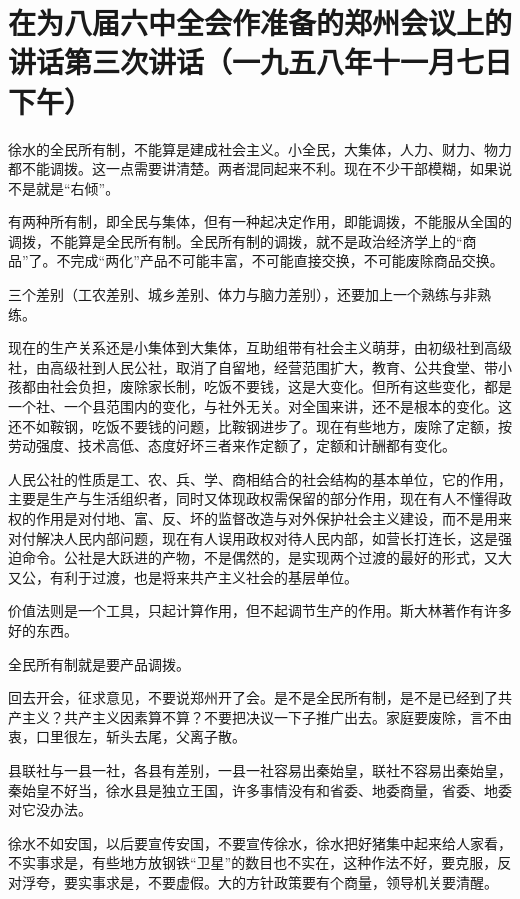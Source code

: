 \section[在为八届六中全会作准备的郑州会议上的讲话第三次讲话（一九五八年十一月七日下午）]{在为八届六中全会作准备的郑州会议上的讲话第三次讲话（一九五八年十一月七日下午）}


徐水的全民所有制，不能算是建成社会主义。小全民，大集体，人力、财力、物力都不能调拨。这一点需要讲清楚。两者混同起来不利。现在不少干部模糊，如果说不是就是“右倾”。

有两种所有制，即全民与集体，但有一种起决定作用，即能调拨，不能服从全国的调拨，不能算是全民所有制。全民所有制的调拨，就不是政治经济学上的“商品”了。不完成“两化”产品不可能丰富，不可能直接交换，不可能废除商品交换。

三个差别（工农差别、城乡差别、体力与脑力差别），还要加上一个熟练与非熟练。

现在的生产关系还是小集体到大集体，互助组带有社会主义萌芽，由初级社到高级社，由高级社到人民公社，取消了自留地，经营范围扩大，教育、公共食堂、带小孩都由社会负担，废除家长制，吃饭不要钱，这是大变化。但所有这些变化，都是一个社、一个县范围内的变化，与社外无关。对全国来讲，还不是根本的变化。这还不如鞍钢，吃饭不要钱的问题，比鞍钢进步了。现在有些地方，废除了定额，按劳动强度、技术高低、态度好坏三者来作定额了，定额和计酬都有变化。

人民公社的性质是工、农、兵、学、商相结合的社会结构的基本单位，它的作用，主要是生产与生活组织者，同时又体现政权需保留的部分作用，现在有人不懂得政权的作用是对付地、富、反、坏的监督改造与对外保护社会主义建设，而不是用来对付解决人民内部问题，现在有人误用政权对待人民内部，如营长打连长，这是强迫命令。公社是大跃进的产物，不是偶然的，是实现两个过渡的最好的形式，又大又公，有利于过渡，也是将来共产主义社会的基层单位。

价值法则是一个工具，只起计算作用，但不起调节生产的作用。斯大林著作有许多好的东西。

全民所有制就是要产品调拨。

回去开会，征求意见，不要说郑州开了会。是不是全民所有制，是不是已经到了共产主义？共产主义因素算不算？不要把决议一下子推广出去。家庭要废除，言不由衷，口里很左，斩头去尾，父离子散。

县联社与一县一社，各县有差别，一县一社容易出秦始皇，联社不容易出秦始皇，秦始皇不好当，徐水县是独立王国，许多事情没有和省委、地委商量，省委、地委对它没办法。

徐水不如安国，以后要宣传安国，不要宣传徐水，徐水把好猪集中起来给人家看，不实事求是，有些地方放钢铁“卫星”的数目也不实在，这种作法不好，要克服，反对浮夸，要实事求是，不要虚假。大的方针政策要有个商量，领导机关要清醒。

